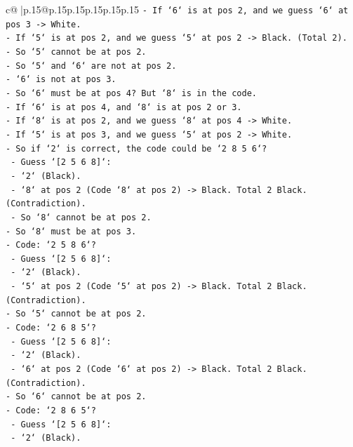 \documentclass{article}
\begin{document}
{\begin{supertabular}{c@{$\;$}|p{.15\linewidth}@{}p{.15\linewidth}p{.15\linewidth}p{.15\linewidth}p{.15\linewidth}p{.15\linewidth}}
{{{\texttt{{-} If `6` is at pos 2, and we guess `6` at pos 3 {-}> White.} \\
\texttt{{-} If `5` is at pos 2, and we guess `5` at pos 2 {-}> Black. (Total 2).} \\
\texttt{{-} So `5` cannot be at pos 2.} \\
\texttt{{-} So `5` and `6` are not at pos 2.} \\
\texttt{{-} `6` is not at pos 3.} \\
\texttt{{-} So `6` must be at pos 4? But `8` is in the code.} \\
\texttt{{-} If `6` is at pos 4, and `8` is at pos 2 or 3.} \\
\texttt{{-} If `8` is at pos 2, and we guess `8` at pos 4 {-}> White.} \\
\texttt{{-} If `5` is at pos 3, and we guess `5` at pos 2 {-}> White.} \\
\texttt{{-} So if `2` is correct, the code could be `2 8 5 6`?} \\
\texttt{    {-} Guess `{[}2 5 6 8{]}`:} \\
\texttt{        {-} `2` (Black).} \\
\texttt{        {-} `8` at pos 2 (Code `8` at pos 2) {-}> Black. Total 2 Black. (Contradiction).} \\
\texttt{    {-} So `8` cannot be at pos 2.} \\
\texttt{{-} So `8` must be at pos 3.} \\
\texttt{{-} Code: `2 5 8 6`?} \\
\texttt{    {-} Guess `{[}2 5 6 8{]}`:} \\
\texttt{        {-} `2` (Black).} \\
\texttt{        {-} `5` at pos 2 (Code `5` at pos 2) {-}> Black. Total 2 Black. (Contradiction).} \\
\texttt{{-} So `5` cannot be at pos 2.} \\
\texttt{{-} Code: `2 6 8 5`?} \\
\texttt{    {-} Guess `{[}2 5 6 8{]}`:} \\
\texttt{        {-} `2` (Black).} \\
\texttt{        {-} `6` at pos 2 (Code `6` at pos 2) {-}> Black. Total 2 Black. (Contradiction).} \\
\texttt{{-} So `6` cannot be at pos 2.} \\
\texttt{{-} Code: `2 8 6 5`?} \\
\texttt{    {-} Guess `{[}2 5 6 8{]}`:} \\
\texttt{        {-} `2` (Black).} \\
}}}
\end{supertabular}}
\end{document}
